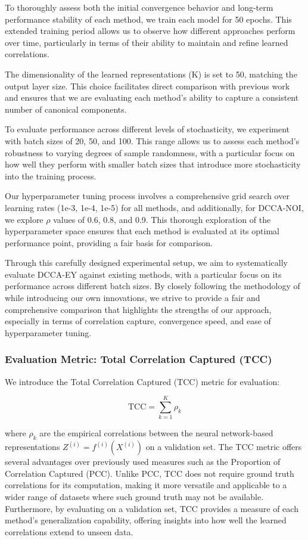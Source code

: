 To thoroughly assess both the initial convergence behavior and long-term performance stability of each method, we train each model for 50 epochs. This extended training period allows us to observe how different approaches perform over time, particularly in terms of their ability to maintain and refine learned correlations.

The dimensionality of the learned representations (K) is set to 50, matching the output layer size. This choice facilitates direct comparison with previous work and ensures that we are evaluating each method's ability to capture a consistent number of canonical components.

To evaluate performance across different levels of stochasticity, we experiment with batch sizes of 20, 50, and 100. This range allows us to assess each method's robustness to varying degrees of sample randomness, with a particular focus on how well they perform with smaller batch sizes that introduce more stochasticity into the training process.

Our hyperparameter tuning process involves a comprehensive grid search over learning rates (1e-3, 1e-4, 1e-5) for all methods, and additionally, for DCCA-NOI, we explore $\rho$ values of 0.6, 0.8, and 0.9. This thorough exploration of the hyperparameter space ensures that each method is evaluated at its optimal performance point, providing a fair basis for comparison.

Through this carefully designed experimental setup, we aim to systematically evaluate DCCA-EY against existing methods, with a particular focus on its performance across different batch sizes. By closely following the methodology of \citet{wang2015stochastic} while introducing our own innovations, we strive to provide a fair and comprehensive comparison that highlights the strengths of our approach, especially in terms of correlation capture, convergence speed, and ease of hyperparameter tuning.

\subsubsection{Evaluation Metric: Total Correlation Captured (TCC)}
We introduce the Total Correlation Captured (TCC) metric for evaluation:

\[
    \text{TCC} = \sum_{k=1}^K \rho_k
\]

where $\rho_k$ are the empirical correlations between the neural network-based representations $Z^{(i)} = f^{(i)}(X^{(i)})$ on a validation set.
The TCC metric offers several advantages over previously used measures such as the Proportion of Correlation Captured (PCC). Unlike PCC, TCC does not require ground truth correlations for its computation, making it more versatile and applicable to a wider range of datasets where such ground truth may not be available. Furthermore, by evaluating on a validation set, TCC provides a measure of each method's generalization capability, offering insights into how well the learned correlations extend to unseen data.

